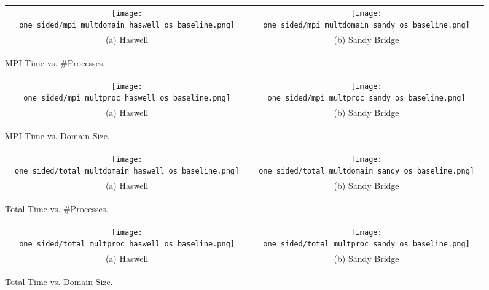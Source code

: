 \begin{enumerate}
		\begin{figure}[h] %
		\hspace*{-0.25\linewidth}\begin{tabular}{cc}
			\texttt{[image: one\_sided/mpi\_multdomain\_haswell\_os\_baseline.png]} & \texttt{[image: one\_sided/mpi\_multdomain\_sandy\_os\_baseline.png]} \\
			(a) Haswell &  (b) Sandy Bridge\\[6pt]
		\end{tabular}
		\caption{MPI Time vs. \#Processes.}
		\label{fig:mpi_multdomain_os_baseline}
	\end{figure}
	
		\begin{figure}[h] %
		\hspace*{-0.25\linewidth}\begin{tabular}{cc}
			\texttt{[image: one\_sided/mpi\_multproc\_haswell\_os\_baseline.png]} & \texttt{[image: one\_sided/mpi\_multproc\_sandy\_os\_baseline.png]} \\
			(a) Haswell &  (b) Sandy Bridge\\[6pt]
		\end{tabular}
		\caption{MPI Time vs. Domain Size.}
		\label{fig:mpi_multproc_os_baseline}
	\end{figure}
	
			\begin{figure}[h] %
		\hspace*{-0.25\linewidth}\begin{tabular}{cc}
			\texttt{[image: one\_sided/total\_multdomain\_haswell\_os\_baseline.png]} & \texttt{[image: one\_sided/total\_multdomain\_sandy\_os\_baseline.png]} \\
			(a) Haswell &  (b) Sandy Bridge\\[6pt]
		\end{tabular}
		\caption{Total Time vs. \#Processes.}
		\label{fig:total_multdomain_os_baseline}
	\end{figure}
	
		\begin{figure}[h] %
		\hspace*{-0.25\linewidth}\begin{tabular}{cc}
			\texttt{[image: one\_sided/total\_multproc\_haswell\_os\_baseline.png]} & \texttt{[image: one\_sided/total\_multproc\_sandy\_os\_baseline.png]} \\
			(a) Haswell &  (b) Sandy Bridge\\[6pt]
		\end{tabular}
		\caption{Total Time vs. Domain Size.}
		\label{fig:total_multproc_os_baseline}
	\end{figure}


\end{enumerate}
